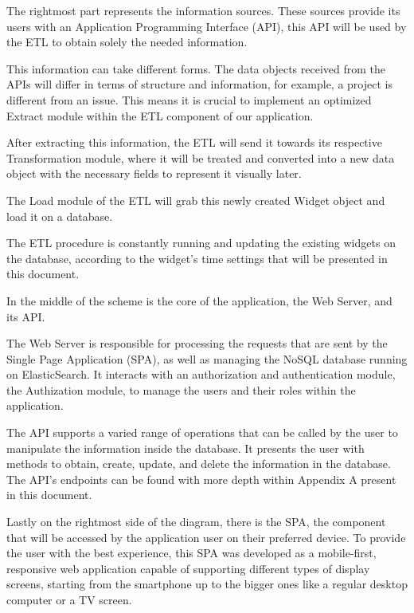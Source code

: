 \documentclass[a4paper,twoside,10pt]{report}
\begin{document}
The rightmost part represents the information sources. These sources provide its users with an Application Programming Interface (API), this API will be used by the  ETL to obtain solely the needed information.

This information can take different forms. The data objects received from the APIs will differ in terms of structure and information, for example, a project is different from an issue. This means it is crucial to implement an optimized Extract module within the ETL component of our application.

After extracting this information, the ETL will send it towards its respective Transformation module, where it will be treated and converted into a new data object with the necessary fields to represent it visually later.

The Load module of the ETL will grab this newly created Widget object and load it on a database.

The ETL procedure is constantly running and updating the existing widgets on the database, according to the widget's time settings that will be presented in this document.

In the middle of the scheme is the core of the application, the Web Server, and its API.

The Web Server is responsible for processing the requests that are sent by the Single Page Application (SPA), as well as managing the NoSQL database running on ElasticSearch\cite{ES}.
It interacts with an authorization and authentication module, the Authization module, to manage the users and their roles within the application.

The API supports a varied range of operations that can be called by the user to manipulate the information inside the database. It presents the user with methods to obtain, create, update, and delete the information in the database.
The API's endpoints can be found with more depth within Appendix A present in this document.

Lastly on the rightmost side of the diagram, there is the SPA, the component that will be accessed by the application user on their preferred device. To provide the user with the best experience, this SPA was developed as a mobile-first, responsive web application capable of supporting different types of display screens, starting from the smartphone up to the bigger ones like a regular desktop computer or a TV screen.
\newpage
\end{document}
